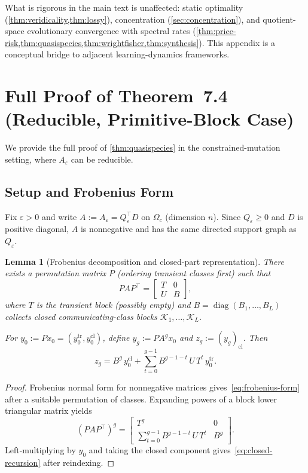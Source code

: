 \documentclass[12pt]{article}
\newtheorem{lemma}[theorem]{Lemma}
\newcommand{\diag}{\operatorname{diag}}
\begin{document}
What is rigorous in the main text is unaffected: static optimality (\cref{thm:veridicality,thm:lossy}), concentration (\cref{sec:concentration}), and quotient-space evolutionary convergence with spectral rates (\cref{thm:price-risk,thm:quasispecies,thm:wrightfisher,thm:synthesis}). This appendix is a conceptual bridge to adjacent learning-dynamics frameworks.

\section{Full Proof of Theorem~7.4 (Reducible, Primitive-Block Case)}\label{app:proof74}

We provide the full proof of \cref{thm:quasispecies} in the constrained-mutation setting, where $A_\varepsilon$ can be reducible.

\subsection{Setup and Frobenius Form}\label{app:frobenius}

Fix $\varepsilon > 0$ and write $A := A_\varepsilon = Q_\varepsilon^\top D$ on $\Omega_c$ (dimension $n$). Since $Q_\varepsilon \ge 0$ and $D$ is positive diagonal, $A$ is nonnegative and has the same directed support graph as $Q_\varepsilon$.

\begin{lemma}[Frobenius decomposition and closed-part representation]\label{lem:frobenius}
There exists a permutation matrix $P$ (ordering transient classes first) such that
\begin{equation}\label{eq:frobenius-form}
PAP^\top =
\begin{bmatrix} T & 0 \\ U & B \end{bmatrix},
\end{equation}
where $T$ is the transient block (possibly empty) and $B = \diag(B_1, \ldots, B_L)$ collects closed communicating-class blocks $\mathcal{K}_1, \ldots, \mathcal{K}_L$.

For $y_0 := Px_0 = (y_0^{\mathrm{tr}}, y_0^{\mathrm{cl}})$, define $y_g := PA^g x_0$ and $z_g := (y_g)_{\mathrm{cl}}$. Then
\begin{equation}\label{eq:closed-recursion}
z_g = B^g\, y_0^{\mathrm{cl}} + \sum_{t=0}^{g-1} B^{g-1-t}\, U\, T^t\, y_0^{\mathrm{tr}}.
\end{equation}
\end{lemma}

\begin{proof}
Frobenius normal form for nonnegative matrices gives~\eqref{eq:frobenius-form} after a suitable permutation of classes. Expanding powers of a block lower triangular matrix yields
\[
(PAP^\top)^g =
\begin{bmatrix} T^g & 0 \\ \sum_{t=0}^{g-1} B^{g-1-t}\, U\, T^t & B^g \end{bmatrix}.
\]
Left-multiplying by $y_0$ and taking the closed component gives~\eqref{eq:closed-recursion} after reindexing.
\end{proof}
\end{document}
